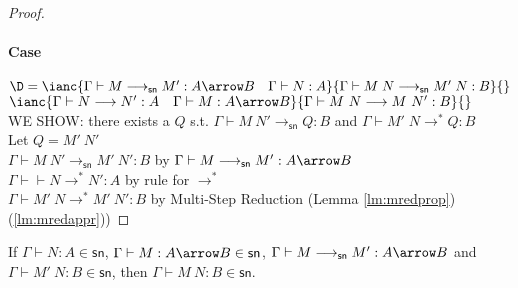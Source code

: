 \documentclass{article}
\newcommand{\csn}{\mathsf{sn}}
\newcommand{\mred}{\longrightarrow^*}
\newcommand{\red}{\longrightarrow}
\newcommand{\redsn}{\longrightarrow_\csn}
\begin{document}
\begin{proof}
\paragraph{Case}
$\D  = \ianc{\Gamma \vdash M \redsn M' : A \arrow B \quad \Gamma \vdash N : A}
            {\Gamma \vdash M\;N \redsn M'\;N : B}{}$
\qquad
$\ianc {\Gamma \vdash N\red N' : A  \quad \Gamma \vdash M : A \arrow B}
       {\Gamma \vdash M~N  \red M~N' : B }{}$
\\[1em]
WE SHOW: there exists a $Q$ s.t. $\Gamma \vdash M~N' \redsn Q : B$ and $\Gamma \vdash M'\;N \mred Q : B$
\\[0.5em]
Let $Q = M'~N'$ \\[0.5em]
$\Gamma \vdash M~N' \redsn M'~N' : B$ \hfill by $\Gamma \vdash M \redsn M' : A \arrow B$ \\
$\Gamma \vdash \vdash N\mred N' : A$ \hfill by rule for $\mred$\\
$\Gamma \vdash M'~N \mred M'~N' : B$ \hfill by Multi-Step Reduction (Lemma \ref{lm:mredprop})(\ref{lm:mredappr}))

\end{proof}

\begin{lemma}\label{lm:backclosnaux}
If $\Gamma \vdash N : A \in \csn$, $\Gamma \vdash M : A \arrow B \in \csn$, $\Gamma \vdash M \redsn M': A \arrow B$ and $\Gamma \vdash M'~N : B \in \csn$, then $\Gamma \vdash M~N : B\in \csn$.
\end{lemma}
\end{document}
